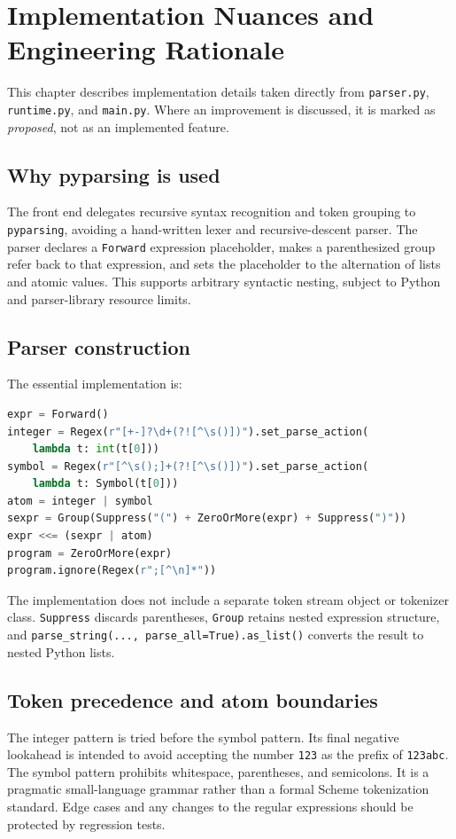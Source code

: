 \documentclass[11pt,a4paper,oneside]{report}
\begin{document}
\chapter{Implementation Nuances and Engineering Rationale}
\label{ch:implementation}
This chapter describes implementation details taken directly from \texttt{parser.py}, \texttt{runtime.py}, and \texttt{main.py}. Where an improvement is discussed, it is marked as \emph{proposed}, not as an implemented feature.
\section{Why pyparsing is used}
The front end delegates recursive syntax recognition and token grouping to \texttt{pyparsing}, avoiding a hand-written lexer and recursive-descent parser. The parser declares a \texttt{Forward} expression placeholder, makes a parenthesized group refer back to that expression, and sets the placeholder to the alternation of lists and atomic values. This supports arbitrary syntactic nesting, subject to Python and parser-library resource limits.
\section{Parser construction}
The essential implementation is:
\begin{lstlisting}[language=Python]
expr = Forward()
integer = Regex(r"[+-]?\d+(?![^\s()])").set_parse_action(
    lambda t: int(t[0]))
symbol = Regex(r"[^\s();]+(?![^\s()])").set_parse_action(
    lambda t: Symbol(t[0]))
atom = integer | symbol
sexpr = Group(Suppress("(") + ZeroOrMore(expr) + Suppress(")"))
expr <<= (sexpr | atom)
program = ZeroOrMore(expr)
program.ignore(Regex(r";[^\n]*"))
\end{lstlisting}
The implementation does not include a separate token stream object or tokenizer class. \texttt{Suppress} discards parentheses, \texttt{Group} retains nested expression structure, and \texttt{parse\_string(..., parse\_all=True).as\_list()} converts the result to nested Python lists.
\section{Token precedence and atom boundaries}
The integer pattern is tried before the symbol pattern. Its final negative lookahead is intended to avoid accepting the number \texttt{123} as the prefix of \texttt{123abc}. The symbol pattern prohibits whitespace, parentheses, and semicolons. It is a pragmatic small-language grammar rather than a formal Scheme tokenization standard. Edge cases and any changes to the regular expressions should be protected by regression tests.
\end{document}
